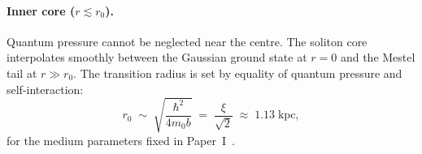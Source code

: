 \documentclass[11pt,a4paper]{article}
\begin{document}
\paragraph{Inner core ($r\lesssim r_0$).}
Quantum pressure cannot be neglected near the centre.  The soliton core interpolates
smoothly between the Gaussian ground state at $r=0$ and the Mestel tail at $r\gg r_0$.
The transition radius is set by equality of quantum pressure and self-interaction:
\begin{equation}
  r_0 \;\sim\; \sqrt{\frac{\hbar^2}{4m_0 b}} \;=\; \frac{\xi}{\sqrt{2}}
  \;\approx\; 1.13\;\mathrm{kpc},
  \label{eq:r0}
\end{equation}
for the medium parameters fixed in Paper~I~\cite{SSV-I}.
\end{document}
